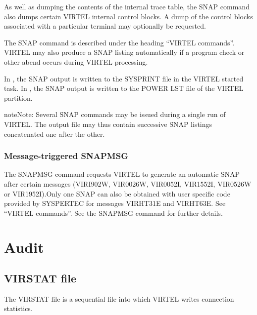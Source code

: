 \documentclass[letterpaper,10pt,english]{sphinxmanual}
\begin{document}
As well as dumping the contents of the internal trace table, the SNAP command also dumps certain VIRTEL internal control blocks. A dump of the control blocks associated with a particular terminal may optionally be requested.

The SNAP command is described under the heading “VIRTEL commands”. VIRTEL may also produce a SNAP listing automatically if a program check or other abend occurs during VIRTEL processing.

In , the SNAP output is written to the SYSPRINT file in the VIRTEL started task.
In , the SNAP output is written to the POWER LST file of the VIRTEL partition.

\begin{sphinxadmonition}{note}{Note:}
Several SNAP commands may be issued during a single run of VIRTEL. The output file may thus contain successive SNAP listings concatenated one after the other.
\end{sphinxadmonition}




\subsection{Message-triggered SNAPMSG}
\label{\detokenize{audit_operations_ and_performance:index-81}}\label{\detokenize{audit_operations_ and_performance:message-triggered-snapmsg}}
The SNAPMSG command requests VIRTEL to generate an automatic SNAP after certain messages (VIRI902W, VIR0026W, VIR0052I, VIR1552I, VIR0526W or VIR1952I).Only one SNAP can also be obtained with user specific code provided by SYSPERTEC for messages VIRHT31E and VIRHT63E. See “VIRTEL commands”. See the SNAPMSG command for further details.


\chapter{Audit}
\label{\detokenize{audit_operations_ and_performance:audit}}\label{\detokenize{audit_operations_ and_performance:index-82}}

\section{VIRSTAT file}
\label{\detokenize{audit_operations_ and_performance:virstat-file}}\label{\detokenize{audit_operations_ and_performance:index-83}}
The VIRSTAT file is a sequential file into which VIRTEL writes connection statistics.
\end{document}
